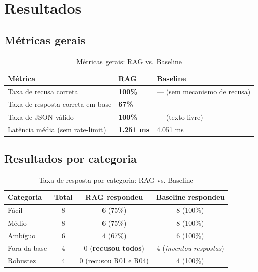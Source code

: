\documentclass[
  12pt,
  a4paper,
  brazil,
  article,
  oneside,
  sumario=tradicional
]{abntex2}
\begin{document}
\section{Resultados}

\subsection{Métricas gerais}

\begin{table}[H]
\caption{Métricas gerais: RAG vs. Baseline}
\label{tab:metricas}
\centering\small
\begin{tabularx}{\textwidth}{Xll}
\toprule
\textbf{Métrica} & \textbf{RAG} & \textbf{Baseline} \\
\midrule
Taxa de recusa correta           & \textbf{100\%}     & — (sem mecanismo de recusa) \\
Taxa de resposta correta em base & \textbf{67\%}      & — \\
Taxa de JSON válido              & \textbf{100\%}     & — (texto livre) \\
Latência média (sem rate-limit)  & \textbf{1.251 ms}  & 4.051 ms \\
\bottomrule
\end{tabularx}
\end{table}

\subsection{Resultados por categoria}

\begin{table}[H]
\caption{Taxa de resposta por categoria: RAG vs. Baseline}
\label{tab:categorias}
\centering\small
\begin{tabularx}{\textwidth}{Xccc}
\toprule
\textbf{Categoria} & \textbf{Total} & \textbf{RAG respondeu} & \textbf{Baseline respondeu} \\
\midrule
Fácil        & 8 & 6 (75\%)                      & 8 (100\%) \\
Médio        & 8 & 6 (75\%)                      & 8 (100\%) \\
Ambíguo      & 6 & 4 (67\%)                      & 6 (100\%) \\
Fora da base & 4 & 0 (\textbf{recusou todos})    & 4 (\textit{inventou respostas}) \\
Robustez     & 4 & 0 (recusou R01 e R04)         & 4 (100\%) \\
\bottomrule
\end{tabularx}
\end{table}
\end{document}
